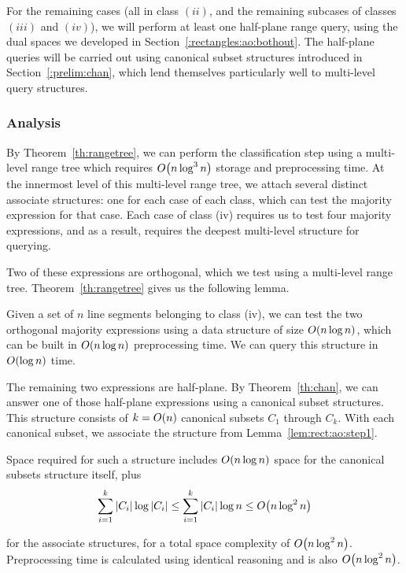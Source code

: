 For the remaining cases (all in class $(ii)$, and the remaining subcases of classes $(iii)$ and $(iv)$), we will perform at least one half-plane range query, using the dual spaces we developed in Section~\ref{:rectangles:ao:bothout}. The half-plane queries will be carried out using canonical subset structures introduced in Section~\ref{:prelim:chan}, which lend themselves particularly well to multi-level query structures.


\subsubsection{Analysis}

By Theorem~\ref{th:rangetree}, we can perform the classification step using a multi-level range tree which requires $O\!\left(n\log^3{n}\right)$ storage and preprocessing time.  At the innermost level of this multi-level range tree, we attach several distinct associate structures: one for each case of each class, which can test the majority expression for that case. Each case of class (iv) requires us to test four majority expressions, and as a result, requires the deepest multi-level structure for querying.  

Two of these expressions are orthogonal, which we test using a multi-level range tree. Theorem~\ref{th:rangetree} gives us the following lemma.

\begin{lemma}
\label{lem:rect:ao:step1}
Given a set of $n$ line segments belonging to class (iv), we can test the two orthogonal majority expressions using a data structure of size $O\!\left(n\log{n}\right)$, which can be built in $O\!\left(n\log{n}\right)$ preprocessing time. We can query this structure in $O\!\left(\log{n}\right)$ time.
\end{lemma}

The remaining two expressions are half-plane. By Theorem~\ref{th:chan}, we can answer one of those half-plane expressions using a canonical subset structures. This structure consists of $k = O\!\left(n\right)$ canonical subsets $C_1$ through $C_k$. With each canonical subset, we associate the structure from Lemma~\ref{lem:rect:ao:step1}.

Space required for such a structure includes $O\!\left(n \log{n}\right)$ space for the canonical subsets structure itself, plus
\[
\sum_{i=1}^k{|C_i| \log{|C_i|}}
\leq \sum_{i=1}^k{|C_i| \log{n}} 
\leq O\!\left(n\log^2{n}\right)
\]

\noindent for the associate structures, for a total space complexity of $O\!\left(n\log^2{n}\right)$. Preprocessing time is calculated using identical reasoning and is also $O\!\left(n\log^2{n}\right)$.

